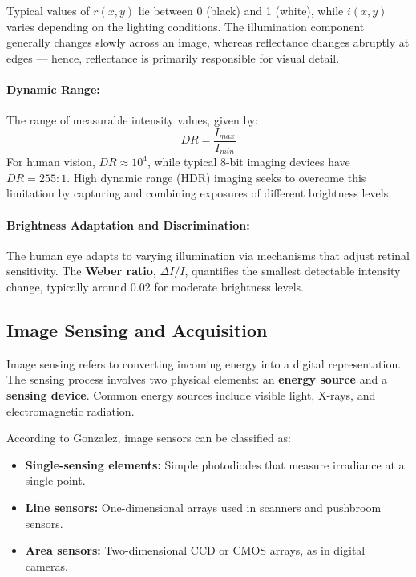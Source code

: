\documentclass[12pt,a4paper]{AnantDocumentation}
\begin{document}
Typical values of $r(x, y)$ lie between 0 (black) and 1 (white), while $i(x, y)$ varies depending on the lighting conditions. The illumination component generally changes slowly across an image, whereas reflectance changes abruptly at edges — hence, reflectance is primarily responsible for visual detail.

\paragraph{Dynamic Range:} The range of measurable intensity values, given by:
\begin{equation}
DR = \frac{I_{max}}{I_{min}}
\end{equation}
For human vision, $DR \approx 10^4$, while typical 8-bit imaging devices have $DR = 255:1$. High dynamic range (HDR) imaging seeks to overcome this limitation by capturing and combining exposures of different brightness levels.

\paragraph{Brightness Adaptation and Discrimination:} The human eye adapts to varying illumination via mechanisms that adjust retinal sensitivity. The \textbf{Weber ratio}, $\Delta I / I$, quantifies the smallest detectable intensity change, typically around 0.02 for moderate brightness levels.

\subsection{Image Sensing and Acquisition}
Image sensing refers to converting incoming energy into a digital representation. The sensing process involves two physical elements: an \textbf{energy source} and a \textbf{sensing device}. Common energy sources include visible light, X-rays, and electromagnetic radiation.

According to Gonzalez, image sensors can be classified as:
\begin{itemize}
\item \textbf{Single-sensing elements:} Simple photodiodes that measure irradiance at a single point.
\item \textbf{Line sensors:} One-dimensional arrays used in scanners and pushbroom sensors.
\item \textbf{Area sensors:} Two-dimensional CCD or CMOS arrays, as in digital cameras.
\end{itemize}
\end{document}
